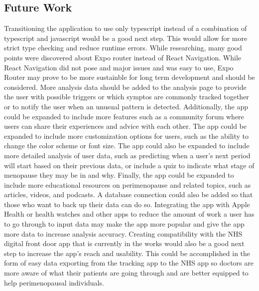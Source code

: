 \subsection{Future Work}
Transitioning the application to use only typescript instead of a combination of typescript and javascript would be a good next step. This would allow for more strict type checking and reduce runtime errors. While researching, many good points were discovered about Expo router instead of React Navigation. While React Navigation did not pose and major issues and was easy to use, Expo Router may prove to be more sustainble for long term development and should be considered. More analysis data should be added to the analysis page to provide the user with possible triggers or which symptos are commonly tracked together or to notify the user when an unusual pattern is detected. Additionally, the app could be expanded to include more features such as a community forum where users can share their experiences and advice with each other. The app could be expanded to include more customization options for users, such as the ability to change the color scheme or font size. The app could also be expanded to include more detailed analysis of user data, such as predicting when a user's next period will start based on their previous data, or include a quiz to indicate what stage of menopause they may be in and why. Finally, the app could be expanded to include more educational resources on perimenopause and related topics, such as articles, videos, and podcasts. A database connection could also be added so that those who want to back up their data can do so. Integrating the app with Apple Health or health watches and other apps to reduce the amount of work a user has to go through to input data may make the app more popular and give the app more data to increase analysis accuracy. Creating compatibility with the NHS digital front door app that is currently in the works would also be a good next step to increase the app's reach and usability. This could be accomplished in the form of easy data exporting from the tracking app to the NHS app so doctors are more aware of what their patients are going through and are better equipped to help perimenopausal individuals.

